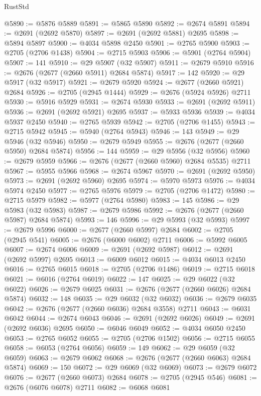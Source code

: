 \begin{lexlean}{RustStd}
\begin{coremodule}
@5890 := @5876 @5889
@5891 := @5865 @5890
@5892 := @2674 @5891
@5894 := @2691 (@2692 @5870)
@5897 := @2691 (@2692 @5881) @2695
@5898 := @5894 @5897
@5900 := @4034 @5898 @2450
@5901 := @2765 @5900
@5903 := @2705 (@2706 @1438)
@5904 := @2715 @5903
@5906 := @5901 (@2764 @5904)
@5907 := 141
@5910 := @29 @5907 (@32 @5907)
@5911 := @2679 @5910
@5916 := @2676 (@2677 (@2660 @5911) @2684 @5874)
@5917 := 142
@5920 := @29 @5917 (@32 @5917)
@5921 := @2679 @5920
@5924 := @2677 (@2660 @5921) @2684
@5926 := @2705 (@2945 @1444)
@5929 := @2676 (@5924 @5926) @2711
@5930 := @5916 @5929
@5931 := @2674 @5930
@5933 := @2691 (@2692 @5911)
@5936 := @2691 (@2692 @5921) @2695
@5937 := @5933 @5936
@5939 := @4034 @5937 @2450
@5940 := @2765 @5939
@5942 := @2705 (@2706 @1455)
@5943 := @2715 @5942
@5945 := @5940 (@2764 @5943)
@5946 := 143
@5949 := @29 @5946 (@32 @5946)
@5950 := @2679 @5949
@5955 := @2676 (@2677 (@2660 @5950) @2684 @5874)
@5956 := 144
@5959 := @29 @5956 (@32 @5956)
@5960 := @2679 @5959
@5966 := @2676 (@2677 (@2660 @5960) @2684 @5535) @2711
@5967 := @5955 @5966
@5968 := @2674 @5967
@5970 := @2691 (@2692 @5950)
@5973 := @2691 (@2692 @5960) @2695
@5974 := @5970 @5973
@5976 := @4034 @5974 @2450
@5977 := @2765 @5976
@5979 := @2705 (@2706 @1472)
@5980 := @2715 @5979
@5982 := @5977 (@2764 @5980)
@5983 := 145
@5986 := @29 @5983 (@32 @5983)
@5987 := @2679 @5986
@5992 := @2676 (@2677 (@2660 @5987) @2684 @5874)
@5993 := 146
@5996 := @29 @5993 (@32 @5993)
@5997 := @2679 @5996
@6000 := @2677 (@2660 @5997) @2684
@6002 := @2705 (@2945 @541)
@6005 := @2676 (@6000 @6002) @2711
@6006 := @5992 @6005
@6007 := @2674 @6006
@6009 := @2691 (@2692 @5987)
@6012 := @2691 (@2692 @5997) @2695
@6013 := @6009 @6012
@6015 := @4034 @6013 @2450
@6016 := @2765 @6015
@6018 := @2705 (@2706 @1486)
@6019 := @2715 @6018
@6021 := @6016 (@2764 @6019)
@6022 := 147
@6025 := @29 @6022 (@32 @6022)
@6026 := @2679 @6025
@6031 := @2676 (@2677 (@2660 @6026) @2684 @5874)
@6032 := 148
@6035 := @29 @6032 (@32 @6032)
@6036 := @2679 @6035
@6042 := @2676 (@2677 (@2660 @6036) @2684 @3558) @2711
@6043 := @6031 @6042
@6044 := @2674 @6043
@6046 := @2691 (@2692 @6026)
@6049 := @2691 (@2692 @6036) @2695
@6050 := @6046 @6049
@6052 := @4034 @6050 @2450
@6053 := @2765 @6052
@6055 := @2705 (@2706 @1502)
@6056 := @2715 @6055
@6058 := @6053 (@2764 @6056)
@6059 := 149
@6062 := @29 @6059 (@32 @6059)
@6063 := @2679 @6062
@6068 := @2676 (@2677 (@2660 @6063) @2684 @5874)
@6069 := 150
@6072 := @29 @6069 (@32 @6069)
@6073 := @2679 @6072
@6076 := @2677 (@2660 @6073) @2684
@6078 := @2705 (@2945 @546)
@6081 := @2676 (@6076 @6078) @2711
@6082 := @6068 @6081

\end{coremodule}
\end{lexlean}

